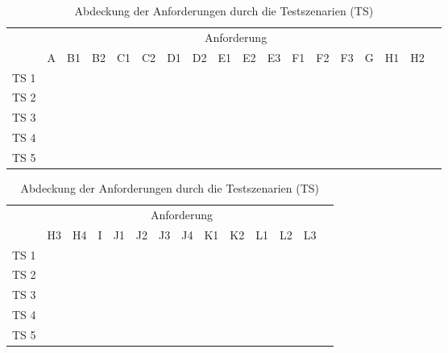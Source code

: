 \begin{table}[tbh]
\caption[Abdeckung der Anforderungen durch die Testszenarien]{Abdeckung der Anforderungen durch die Testszenarien (TS)}
\label{tab:anforderungs_abdeckung}
\centering
\begin{tabular}{|r|c|c|c|c|c|c|c|c|c|c|c|c|c|c|c|c|c|}
	\cline{2-17}
	\multicolumn{1}{r|}{} & \multicolumn{16}{|c|}{Anforderung} \\ \cline{2-17}
	\multicolumn{1}{r|}{} & A & B1 & B2 & C1 & C2 & D1 & D2 & E1 & E2 & E3 & F1 & F2 & F3 & G & H1 & H2\\ \hline
	TS 1 & \Checkmark & \Checkmark &  & \Checkmark & \Checkmark & \Checkmark & \Checkmark & \Checkmark & \Checkmark & \Checkmark & \Checkmark & \Checkmark & \Checkmark & & \Checkmark & \Checkmark \\ \hline
	TS 2 & \Checkmark & \Checkmark & & \Checkmark & \Checkmark & & & \Checkmark & & & \Checkmark & \Checkmark & \Checkmark & & & \Checkmark \\ \hline
	TS 3 & \Checkmark & \Checkmark & & \Checkmark & \Checkmark & & & \Checkmark & & & \Checkmark & & & & & \Checkmark \\ \hline
	TS 4 & \Checkmark & \Checkmark & \Checkmark & \Checkmark & \Checkmark & & \Checkmark & \Checkmark & & \Checkmark & \Checkmark & \Checkmark & \Checkmark & \Checkmark & & \\ \hline
	TS 5 & \Checkmark & \Checkmark & \Checkmark & \Checkmark & \Checkmark & & & \Checkmark & & & \Checkmark & \Checkmark & \Checkmark & \Checkmark & & \Checkmark \\ \hline
\end{tabular}

\vspace{2ex}

\begin{tabular}{|r|c|c|c|c|c|c|c|c|c|c|c|c|c|}
	\cline{2-13}
	\multicolumn{1}{r|}{} & \multicolumn{12}{|c|}{Anforderung} \\ \cline{2-13}
	\multicolumn{1}{r|}{} & H3 & H4 & I & J1 & J2 & J3 & J4 & K1 & K2 & L1 & L2 & L3 \\ \hline
	TS 1 & & & & & \Checkmark & & & & & & & \\ \hline
	TS 2 & \Checkmark & \Checkmark & \Checkmark & & \Checkmark & & & \Checkmark & \Checkmark & & & \\ \hline
	TS 3 & & & & & & \Checkmark & \Checkmark & & \Checkmark & & & \\ \hline
	TS 4 & & & & \Checkmark & & & & & & \Checkmark & \Checkmark & \Checkmark \\ \hline
	TS 5 & & & & \Checkmark & \Checkmark & \Checkmark & \Checkmark & \Checkmark & \Checkmark & \Checkmark & \Checkmark & \Checkmark \\ \hline
\end{tabular}
\end{table}

